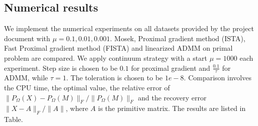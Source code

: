 \documentclass{article}
\begin{document}
\subsection{Numerical results}
We implement the numerical experiments on all datasets provided by the project document with $\mu=0.1,0.01,0.001$. Mosek, Proximal gradient method (ISTA), Fast Proximal gradient method (FISTA) and linearized ADMM on primal problem are compared. We apply continuum strategy with a start $\mu=1000$ each experiment. Step size is chosen to be $0.1$ for proximal gradient and $\frac{0.1}{\tau}$ for ADMM, while $\tau = 1$. The toleration is chosen to be $1e-8$. Comparison involves the CPU time, the optimal value, the relative error of $\|P_\Omega(X)-P_\Omega(M)\|_F/\|P_\Omega(M)\|_F$ and the recovery error $\|X-A\|_F/\|A\|$, where $A$ is the primitive matrix. The results are listed in Table.
\end{document}
